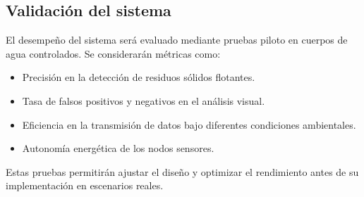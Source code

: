 \subsection{Validación del sistema}
El desempeño del sistema será evaluado mediante pruebas piloto en cuerpos de agua controlados. Se considerarán métricas como:
\begin{itemize}
    \item Precisión en la detección de residuos sólidos flotantes.
    \item Tasa de falsos positivos y negativos en el análisis visual.
    \item Eficiencia en la transmisión de datos bajo diferentes condiciones ambientales.
    \item Autonomía energética de los nodos sensores.
\end{itemize}
Estas pruebas permitirán ajustar el diseño y optimizar el rendimiento antes de su implementación en escenarios reales.